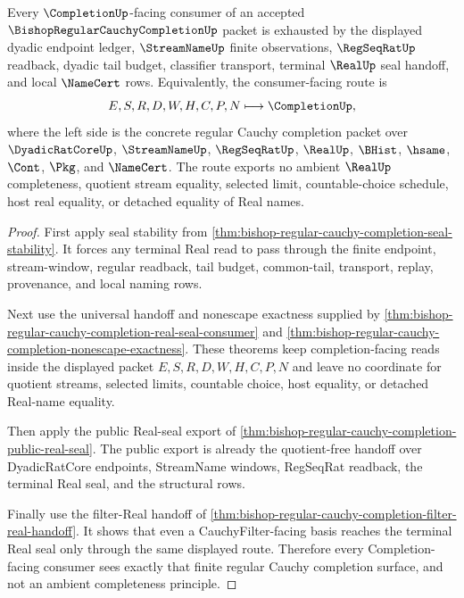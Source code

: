 \begin{theorem}
\label{thm:bishop-regular-cauchy-completion-consumer-exactness}
Every $\CompletionUp$-facing consumer of an accepted $\BishopRegularCauchyCompletionUp$ packet is exhausted by the displayed dyadic endpoint ledger, $\StreamNameUp$ finite observations, $\RegSeqRatUp$ readback, dyadic tail budget, classifier transport, terminal $\RealUp$ seal handoff, and local $\NameCert$ rows. Equivalently, the consumer-facing route is
$$
E,S,R,D,W,H,C,P,N \longmapsto \CompletionUp,
$$
where the left side is the concrete regular Cauchy completion packet over $\DyadicRatCoreUp$, $\StreamNameUp$, $\RegSeqRatUp$, $\RealUp$, $\BHist$, $\hsame$, $\Cont$, $\Pkg$, and $\NameCert$. The route exports no ambient $\RealUp$ completeness, quotient stream equality, selected limit, countable-choice schedule, host real equality, or detached equality of Real names.
\end{theorem}
\begin{proof}
First apply seal stability from \autoref{thm:bishop-regular-cauchy-completion-seal-stability}. It forces any terminal Real read to pass through the finite endpoint, stream-window, regular readback, tail budget, common-tail, transport, replay, provenance, and local naming rows.

Next use the universal handoff and nonescape exactness supplied by \autoref{thm:bishop-regular-cauchy-completion-real-seal-consumer} and \autoref{thm:bishop-regular-cauchy-completion-nonescape-exactness}. These theorems keep completion-facing reads inside the displayed packet $E,S,R,D,W,H,C,P,N$ and leave no coordinate for quotient streams, selected limits, countable choice, host equality, or detached Real-name equality.

Then apply the public Real-seal export of \autoref{thm:bishop-regular-cauchy-completion-public-real-seal}. The public export is already the quotient-free handoff over DyadicRatCore endpoints, StreamName windows, RegSeqRat readback, the terminal Real seal, and the structural rows.

Finally use the filter-Real handoff of \autoref{thm:bishop-regular-cauchy-completion-filter-real-handoff}. It shows that even a CauchyFilter-facing basis reaches the terminal Real seal only through the same displayed route. Therefore every Completion-facing consumer sees exactly that finite regular Cauchy completion surface, and not an ambient completeness principle.
\end{proof}

